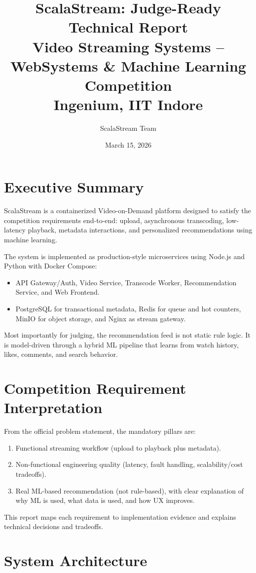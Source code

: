 \documentclass[11pt,a4paper]{article}
\title{\textbf{ScalaStream: Judge-Ready Technical Report}\\
Video Streaming Systems -- WebSystems \& Machine Learning Competition\\
Ingenium, IIT Indore}
\author{ScalaStream Team}
\date{March 15, 2026}
\begin{document}
\maketitle
\tableofcontents
\newpage

\section{Executive Summary}
ScalaStream is a containerized Video-on-Demand platform designed to satisfy the competition requirements end-to-end: upload, asynchronous transcoding, low-latency playback, metadata interactions, and personalized recommendations using machine learning.

The system is implemented as production-style microservices using Node.js and Python with Docker Compose:
\begin{itemize}[leftmargin=1.2em]
  \item API Gateway/Auth, Video Service, Transcode Worker, Recommendation Service, and Web Frontend.
  \item PostgreSQL for transactional metadata, Redis for queue and hot counters, MinIO for object storage, and Nginx as stream gateway.
\end{itemize}

Most importantly for judging, the recommendation feed is not static rule logic. It is model-driven through a hybrid ML pipeline that learns from watch history, likes, comments, and search behavior.

\section{Competition Requirement Interpretation}
From the official problem statement, the mandatory pillars are:
\begin{enumerate}[leftmargin=1.4em]
  \item Functional streaming workflow (upload to playback plus metadata).
  \item Non-functional engineering quality (latency, fault handling, scalability/cost tradeoffs).
  \item Real ML-based recommendation (not rule-based), with clear explanation of why ML is used, what data is used, and how UX improves.
\end{enumerate}

This report maps each requirement to implementation evidence and explains technical decisions and tradeoffs.

\section{System Architecture}
\end{document}

